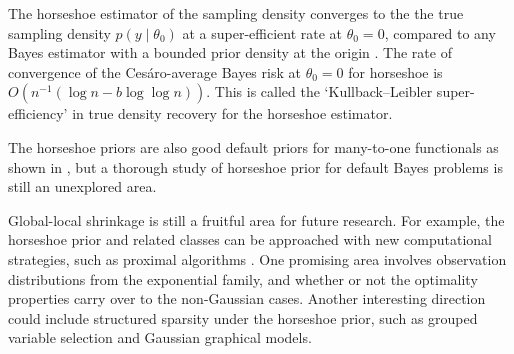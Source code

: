 \documentclass[sts,preprint]{imsart}
\begin{document}
The horseshoe estimator of the sampling density converges to the the true sampling density $p(y \mid \theta_0)$ at a super-efficient rate at $\theta_0 = 0$, compared to any Bayes estimator with a bounded prior density at the origin \citep[\textit{vide} Theorem 4]{carvalho2010horseshoe}. The rate of convergence of the Ces\'aro-average Bayes risk at $\theta_0 = 0$ for horseshoe is $O(n^{-1}(\log n - b \log \log n))$. This is called the `Kullback--Leibler super-efficiency' in true density recovery for the horseshoe estimator.

The horseshoe priors are also good default priors for many-to-one functionals as shown in \citet{bhadra2015default}, but a thorough study of horseshoe prior for default Bayes problems is still an unexplored area. 

Global-local shrinkage is still a fruitful area for future research. For example, the horseshoe prior and related classes can be approached with new computational strategies, such as proximal algorithms \citep{polson2015proximal}. One promising area involves observation distributions from the exponential family, and whether or not the optimality properties carry over to the non-Gaussian cases. Another interesting direction could include structured sparsity under the horseshoe prior, such as grouped variable selection and Gaussian graphical models.


\end{document}
